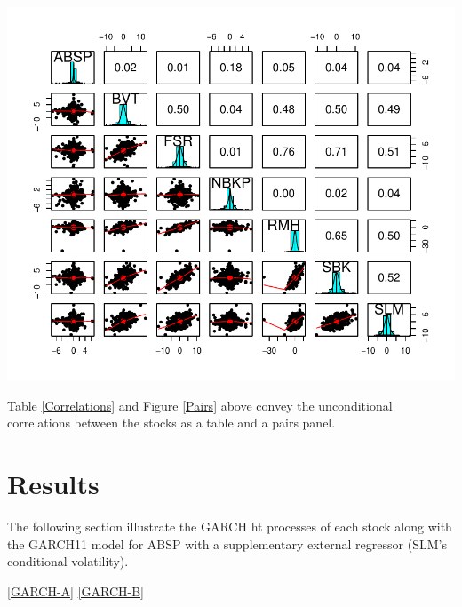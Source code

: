\documentclass[11pt,preprint, authoryear]{elsarticle}
\let\origfigure\figure
\let\endorigfigure\endfigure
\renewenvironment{figure}[1][2] {
    \expandafter\origfigure\expandafter[H]
} {
    \endorigfigure
}
\numberwithin{equation}{section}
\numberwithin{figure}{section}
\numberwithin{table}{section}
\begin{document}
\begin{figure}[H]
{\centering \includegraphics{Template_files/figure-latex/figure3-1} 

}

\caption{Pairs Panel \label{Pairs}}\label{fig:figure3}
\end{figure}

Table \ref{Correlations} and Figure \ref{Pairs} above convey the
unconditional correlations between the stocks as a table and a pairs
panel.

\section{Results}\label{results}

The following section illustrate the GARCH ht processes of each stock
along with the GARCH11 model for ABSP with a supplementary external
regressor (SLM's conditional volatility).

\ref{GARCH-A} \ref{GARCH-B}
\end{document}

